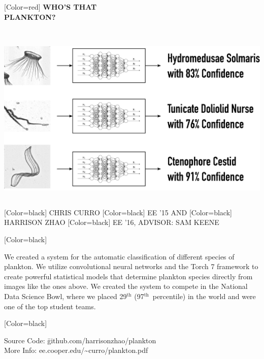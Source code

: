 \documentclass{article}
\begin{document}
\begin{minipage}[c]{20in}
{ 
[Color=red]
\fontsize{4in}{0.8in}\selectfont 
\bfseries
WHO'S THAT \vspace{0in}\\ PLANKTON?
}
\end{minipage}
\vspace{1in}\\
\colorbox{white}{
\begin{minipage}{28in}
\centering
\includegraphics[width=25in]{figure.pdf}
\end{minipage}
}
\vspace{1in}\\
{
[Color=black]
\fontsize{1in}{1em}\selectfont 
CHRIS CURRO
}
{
[Color=black]
\fontsize{0.8in}{1em}\selectfont 
EE '15 AND
}
{
[Color=black]
\fontsize{1in}{1em}\selectfont 
HARRISON ZHAO
}
{
[Color=black]
\fontsize{0.8in}{1em}\selectfont 
EE '16, ADVISOR: SAM KEENE
}
\vspace{0.8in}\\
\begin{minipage}{16.8in}
{
	[Color=black]
	\fontsize{0.6in}{8em}\selectfont

    We created a system for the automatic classification of different species
	of plankton. We utilize convolutional neural networks and the Torch 7 framework
	to create powerful statistical models that determine plankton species directly from
	images like the ones above. We created the system to compete in the National Data Science Bowl, 
	where we placed 29$^\text{th}$ (97$^\text{th}$~percentile) in the world and were one of the
	top student teams.


} \end{minipage} 
\hfill
\begin{minipage}{11in}
{
	[Color=black]
	\fontsize{0.6in}{8em}\selectfont
	\begin{tabbing}
	Source Code: \= github.com/harrisonzhao/plankton \\
	More Info: \> ee.cooper.edu/\textasciitilde{}curro/plankton.pdf
	\end{tabbing}
} 
\end{minipage} 
\end{document}
